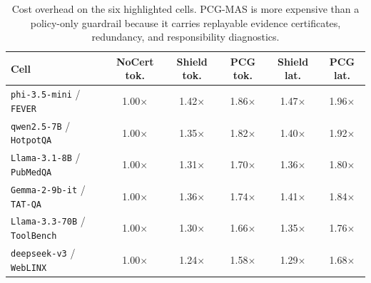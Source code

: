 \begin{table}[t]
\centering
\caption{\small Cost overhead on the six highlighted cells. PCG-MAS is more expensive than a policy-only guardrail because it carries replayable evidence certificates, redundancy, and responsibility diagnostics.}
\label{tab:cost_overhead_main}
\scriptsize
\begin{tabular}{lccccc}
\toprule
Cell & NoCert tok. & Shield tok. & PCG tok. & Shield lat. & PCG lat. \\
\midrule
\texttt{phi-3.5-mini} / \texttt{FEVER} & 1.00$\times$ & 1.42$\times$ & 1.86$\times$ & 1.47$\times$ & 1.96$\times$ \\
\texttt{qwen2.5-7B} / \texttt{HotpotQA} & 1.00$\times$ & 1.35$\times$ & 1.82$\times$ & 1.40$\times$ & 1.92$\times$ \\
\texttt{Llama-3.1-8B} / \texttt{PubMedQA} & 1.00$\times$ & 1.31$\times$ & 1.70$\times$ & 1.36$\times$ & 1.80$\times$ \\
\texttt{Gemma-2-9b-it} / \texttt{TAT-QA} & 1.00$\times$ & 1.36$\times$ & 1.74$\times$ & 1.41$\times$ & 1.84$\times$ \\
\texttt{Llama-3.3-70B} / \texttt{ToolBench} & 1.00$\times$ & 1.30$\times$ & 1.66$\times$ & 1.35$\times$ & 1.76$\times$ \\
\texttt{deepseek-v3} / \texttt{WebLINX} & 1.00$\times$ & 1.24$\times$ & 1.58$\times$ & 1.29$\times$ & 1.68$\times$ \\
\bottomrule
\end{tabular}
\end{table}
